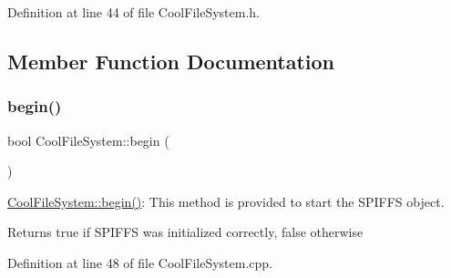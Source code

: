 Definition at line 44 of file Cool\+File\+System.\+h.



\subsection{Member Function Documentation}
\mbox{\label{class_cool_file_system_a6ba6f666ed4c530174f8569d2c636748}} 
\subsubsection{\texorpdfstring{begin()}{begin()}}
{\footnotesize\ttfamily bool Cool\+File\+System\+::begin (\begin{DoxyParamCaption}{ }\end{DoxyParamCaption})}

\hyperlink{class_cool_file_system_a6ba6f666ed4c530174f8569d2c636748}{Cool\+File\+System\+::begin()}\+: This method is provided to start the S\+P\+I\+F\+FS object.

\begin{DoxyReturn}{Returns}
true if S\+P\+I\+F\+FS was initialized correctly, false otherwise 
\end{DoxyReturn}


Definition at line 48 of file Cool\+File\+System.\+cpp.


